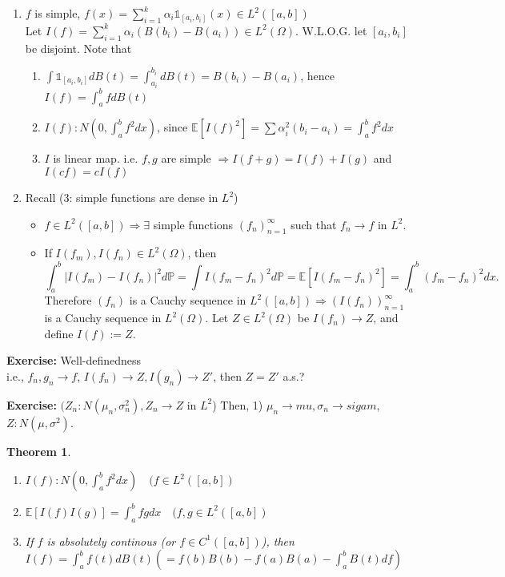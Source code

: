 \documentclass[12pt]{report}
\renewcommand{\P}{\mathbb{P}}
\newcommand{\E}{\mathbb{E}}
\renewcommand{\1}{\mathbb{1}}
\renewcommand{\O}{\Omega}
\theoremstyle{break}
\newtheorem{thm}{Theorem}[section] %
\theoremstyle{newdef}
\theoremstyle{remark}
\begin{document}
\begin{enumerate}[label=\textbf{Step \arabic*}]
\item $f$ is simple, $f(x) = \sum_{i=1}^k \alpha_i \1_{[a_i,b_i]}(x) \in L^2([a,b])$\\
Let $I(f) = \sum_{i=1}^k \alpha_i(B(b_i) - B(a_i)) \in L^2(\O)$. W.L.O.G. let $[a_i,b_i]$ be disjoint. Note that
\begin{enumerate}
\item $\int \1_{[a_i,b_i]}dB(t) = \int_{a_i}^{b_i} dB(t) = B(b_i) - B(a_i)$, hence $I(f) = \int_a^b fdB(t)$
\item $I(f) : N(0, \int_a^b f^2 dx)$, since $\E[I(f)^2] = \sum \alpha_i^2 (b_i-a_i) = \int_a^b f^2 dx$
\item $I$ is linear map. i.e. $f, g$ are simple $\Rightarrow I(f+g) = I(f) + I(g)$ and $I(cf) = cI(f)$
\end{enumerate}

\item Recall (3: simple functions are dense in $L^2$)
\begin{itemize}[wide]
\item $f \in L^2([a,b]) \Rightarrow \exists$ simple functions $(f_n)_{n=1}^\infty$ such that $f_n \rightarrow f$ in $L^2$.
\item If $I(f_m), I(f_n) \in L^2(\O)$, then
$$
\int_a^b |I(f_m) - I(f_n)|^2 d\P = \int I(f_m-f_n)^2 d\P = \E[I(f_m-f_n)^2] = \int_a^b (f_m-f_n)^2 dx.
$$
Therefore $(f_n)$ is a Cauchy sequence in $L^2([a,b]) \Rightarrow (I(f_n))_{n=1}^\infty$ is a Cauchy sequence in $L^2(\O)$.
Let $Z \in L^2(\O)$ be $I(f_n) \rightarrow Z$, and define $I(f) := Z$.
\end{itemize}
\end{enumerate}


\textbf{Exercise:}  Well-definedness\\
i.e., $f_n, g_n \rightarrow f$, $I(f_n) \rightarrow Z, I(g_n) \rightarrow Z'$, then $Z = Z'$ a.s.?

\textbf{Exercise:} $(Z_n: N(\mu_n, \sigma_n^2), Z_n \rightarrow Z$ in $L^2$)
Then, 1) $\mu_n \rightarrow mu, \sigma_n \rightarrow sigam$, $Z : N (\mu, \sigma^2)$.

\begin{thm}
\leavevmode
\vspace{-6mm}
\begin{enumerate}
\item $I(f) : N(0, \int_a^b f^2dx) \quad (f \in L^2([a,b])$
\item $\E[I(f)I(g)] = \int_a^b fgdx \quad (f,g \in L^2([a,b])$
\item If $f$ is absolutely continous (or $f \in C^1([a,b])$), then $I(f) = \int_a^b f(t)dB(t) (= f(b)B(b) - f(a)B(a) - \int_a^b B(t)df)$
\end{enumerate}
\end{thm}
\end{document}
